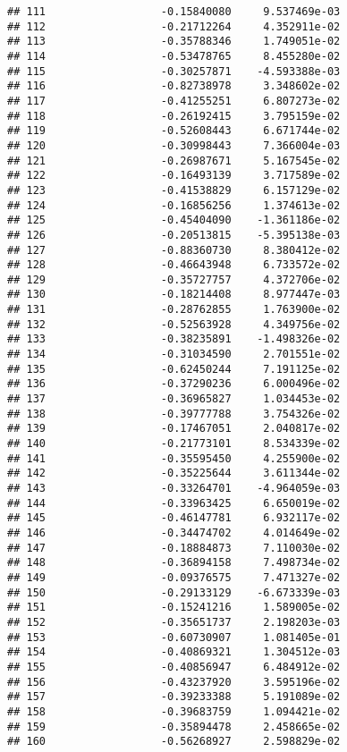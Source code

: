 \documentclass[
]{article}
\begin{document}
\begin{verbatim}
## 111                  -0.15840080     9.537469e-03
## 112                  -0.21712264     4.352911e-02
## 113                  -0.35788346     1.749051e-02
## 114                  -0.53478765     8.455280e-02
## 115                  -0.30257871    -4.593388e-03
## 116                  -0.82738978     3.348602e-02
## 117                  -0.41255251     6.807273e-02
## 118                  -0.26192415     3.795159e-02
## 119                  -0.52608443     6.671744e-02
## 120                  -0.30998443     7.366004e-03
## 121                  -0.26987671     5.167545e-02
## 122                  -0.16493139     3.717589e-02
## 123                  -0.41538829     6.157129e-02
## 124                  -0.16856256     1.374613e-02
## 125                  -0.45404090    -1.361186e-02
## 126                  -0.20513815    -5.395138e-03
## 127                  -0.88360730     8.380412e-02
## 128                  -0.46643948     6.733572e-02
## 129                  -0.35727757     4.372706e-02
## 130                  -0.18214408     8.977447e-03
## 131                  -0.28762855     1.763900e-02
## 132                  -0.52563928     4.349756e-02
## 133                  -0.38235891    -1.498326e-02
## 134                  -0.31034590     2.701551e-02
## 135                  -0.62450244     7.191125e-02
## 136                  -0.37290236     6.000496e-02
## 137                  -0.36965827     1.034453e-02
## 138                  -0.39777788     3.754326e-02
## 139                  -0.17467051     2.040817e-02
## 140                  -0.21773101     8.534339e-02
## 141                  -0.35595450     4.255900e-02
## 142                  -0.35225644     3.611344e-02
## 143                  -0.33264701    -4.964059e-03
## 144                  -0.33963425     6.650019e-02
## 145                  -0.46147781     6.932117e-02
## 146                  -0.34474702     4.014649e-02
## 147                  -0.18884873     7.110030e-02
## 148                  -0.36894158     7.498734e-02
## 149                  -0.09376575     7.471327e-02
## 150                  -0.29133129    -6.673339e-03
## 151                  -0.15241216     1.589005e-02
## 152                  -0.35651737     2.198203e-03
## 153                  -0.60730907     1.081405e-01
## 154                  -0.40869321     1.304512e-03
## 155                  -0.40856947     6.484912e-02
## 156                  -0.43237920     3.595196e-02
## 157                  -0.39233388     5.191089e-02
## 158                  -0.39683759     1.094421e-02
## 159                  -0.35894478     2.458665e-02
## 160                  -0.56268927     2.598829e-02

\end{verbatim}
\end{document}
